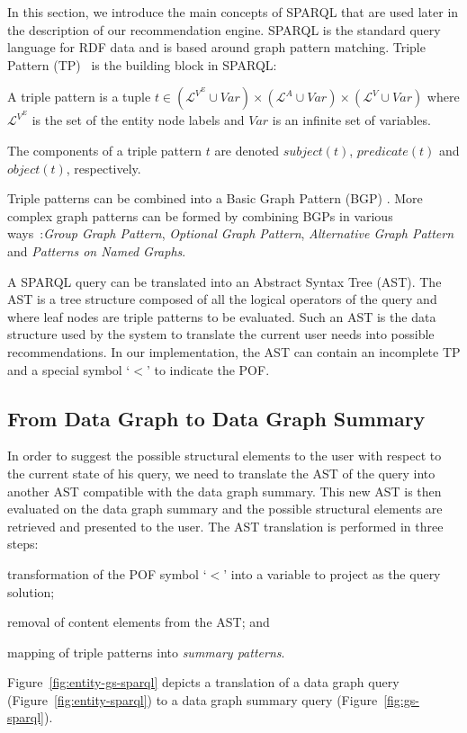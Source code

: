 In this section, we introduce the main concepts of SPARQL that are used later in the description of our recommendation engine. SPARQL is the standard query language for RDF data and is based around graph pattern matching. Triple Pattern (TP)~\cite{PrudS08} is the building block in SPARQL:

\begin{definition} A triple pattern is a tuple $t \in (\mathcal{L}^{V^E} \cup Var) \times (\mathcal{L}^A \cup Var) \times (\mathcal{L}^V \cup Var)$ where $\mathcal{L}^{V^E}$ is the set of the entity node labels and $Var$ is an infinite set of variables.
\label{def:triple-pattern}
\end{definition}
The components of a triple pattern $t$ are denoted $subject(t)$, $predicate(t)$ and $object(t)$, respectively.

Triple patterns can be combined into a Basic Graph Pattern (BGP) \cite{PrudS08}. More complex graph patterns can be formed by combining BGPs in various ways~\cite{PrudS08}:\emph{Group Graph Pattern}, \emph{Optional Graph Pattern}, \emph{Alternative Graph Pattern} and \emph{Patterns on Named Graphs}.

A SPARQL query can be translated into an Abstract Syntax Tree (AST). The AST is a tree structure composed of all the logical operators of the query and where leaf nodes are triple patterns to be evaluated. Such an AST is the data structure used by the system to translate the current user needs into possible recommendations. In our implementation, the AST can contain an incomplete TP and a special symbol `$<$' to indicate the POF.

\subsection{From Data Graph to Data Graph Summary}

In order to suggest the possible structural elements to the user with respect to the current state of his query, we need to translate the AST of the query into another AST compatible with the data graph summary. This new AST is then evaluated on the data graph summary and the possible structural elements are retrieved and presented to the user. The AST translation is performed in three steps: 
\begin{inparaenum}
\item transformation of the POF symbol `$<$' into a variable to project as the query solution; 
\item removal of content elements from the AST; and
\item mapping of triple patterns into \emph{summary patterns}.
\end{inparaenum}
Figure~\ref{fig:entity-gs-sparql} depicts a translation of a data graph query (Figure~\ref{fig:entity-sparql}) to a data graph summary query (Figure~\ref{fig:gs-sparql}).

